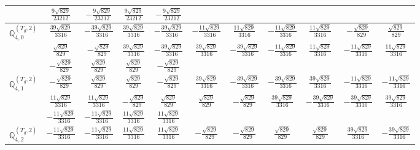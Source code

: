 \documentclass[fleqn,10pt,landscape]{article}
\begin{document}
\begin{itemize}
{\begin{center}
\begin{longtable}{ccccccccccc}
& $ \frac{9 \sqrt{829}}{23212} $ & $ - \frac{9 \sqrt{829}}{23212} $ & $ \frac{9 \sqrt{829}}{23212} $ & $ - \frac{9 \sqrt{829}}{23212} $ & $  $ & $  $ & $  $ & $  $ & $  $ & $  $ \\ \hline
$\mathbb{Q}_{4,0}^{(T_{g},2)}$ & $ \frac{39 \sqrt{829}}{3316} $ & $ - \frac{39 \sqrt{829}}{3316} $ & $ \frac{39 \sqrt{829}}{3316} $ & $ - \frac{39 \sqrt{829}}{3316} $ & $ - \frac{11 \sqrt{829}}{3316} $ & $ \frac{11 \sqrt{829}}{3316} $ & $ - \frac{11 \sqrt{829}}{3316} $ & $ \frac{11 \sqrt{829}}{3316} $ & $ - \frac{\sqrt{829}}{829} $ & $ \frac{\sqrt{829}}{829} $ \\
& $ \frac{\sqrt{829}}{829} $ & $ - \frac{\sqrt{829}}{829} $ & $ \frac{39 \sqrt{829}}{3316} $ & $ - \frac{39 \sqrt{829}}{3316} $ & $ \frac{39 \sqrt{829}}{3316} $ & $ - \frac{39 \sqrt{829}}{3316} $ & $ - \frac{11 \sqrt{829}}{3316} $ & $ \frac{11 \sqrt{829}}{3316} $ & $ - \frac{11 \sqrt{829}}{3316} $ & $ \frac{11 \sqrt{829}}{3316} $ \\
& $ - \frac{\sqrt{829}}{829} $ & $ \frac{\sqrt{829}}{829} $ & $ \frac{\sqrt{829}}{829} $ & $ - \frac{\sqrt{829}}{829} $ & $  $ & $  $ & $  $ & $  $ & $  $ & $  $ \\ \hline
$\mathbb{Q}_{4,1}^{(T_{g},2)}$ & $ - \frac{\sqrt{829}}{829} $ & $ \frac{\sqrt{829}}{829} $ & $ \frac{\sqrt{829}}{829} $ & $ - \frac{\sqrt{829}}{829} $ & $ \frac{39 \sqrt{829}}{3316} $ & $ - \frac{39 \sqrt{829}}{3316} $ & $ - \frac{39 \sqrt{829}}{3316} $ & $ \frac{39 \sqrt{829}}{3316} $ & $ - \frac{11 \sqrt{829}}{3316} $ & $ - \frac{11 \sqrt{829}}{3316} $ \\
& $ \frac{11 \sqrt{829}}{3316} $ & $ \frac{11 \sqrt{829}}{3316} $ & $ - \frac{\sqrt{829}}{829} $ & $ \frac{\sqrt{829}}{829} $ & $ \frac{\sqrt{829}}{829} $ & $ - \frac{\sqrt{829}}{829} $ & $ \frac{39 \sqrt{829}}{3316} $ & $ - \frac{39 \sqrt{829}}{3316} $ & $ - \frac{39 \sqrt{829}}{3316} $ & $ \frac{39 \sqrt{829}}{3316} $ \\
& $ - \frac{11 \sqrt{829}}{3316} $ & $ - \frac{11 \sqrt{829}}{3316} $ & $ \frac{11 \sqrt{829}}{3316} $ & $ \frac{11 \sqrt{829}}{3316} $ & $  $ & $  $ & $  $ & $  $ & $  $ & $  $ \\ \hline
$\mathbb{Q}_{4,2}^{(T_{g},2)}$ & $ - \frac{11 \sqrt{829}}{3316} $ & $ - \frac{11 \sqrt{829}}{3316} $ & $ \frac{11 \sqrt{829}}{3316} $ & $ \frac{11 \sqrt{829}}{3316} $ & $ - \frac{\sqrt{829}}{829} $ & $ - \frac{\sqrt{829}}{829} $ & $ \frac{\sqrt{829}}{829} $ & $ \frac{\sqrt{829}}{829} $ & $ \frac{39 \sqrt{829}}{3316} $ & $ - \frac{39 \sqrt{829}}{3316} $ \\

\end{longtable}
\end{center}}
\end{itemize}
\end{document}
